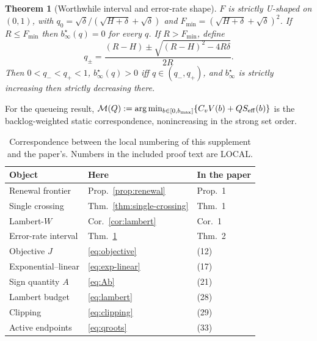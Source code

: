 \documentclass[journal]{IEEEtran}
\newtheorem{theorem}{Theorem}
\theoremstyle{definition}
\begin{document}
\begin{theorem}[Worthwhile interval and error-rate shape]
\label{thm:q-shape}
\(F\) is strictly U-shaped on \((0,1)\), with
\(q_0=\sqrt{\delta}/(\sqrt{H+\delta}+\sqrt{\delta})\) and
\(F_{\min}=(\sqrt{H+\delta}+\sqrt{\delta})^2\).  If \(R\leq F_{\min}\) then
\(b_\infty^\star(q)=0\) for every \(q\).  If \(R>F_{\min}\), define
\begin{equation}
 q_\pm=\frac{(R-H)\pm\sqrt{(R-H)^2-4R\delta}}{2R}.
\label{eq:qroots}
\end{equation}
Then \(0<q_-<q_+<1\), \(b_\infty^\star(q)>0\) iff \(q\in(q_-,q_+)\), and
\(b_\infty^\star\) is strictly increasing then strictly decreasing there.
\end{theorem}

For the queueing result, \(\mathcal M(Q):=\arg\min_{b\in[0,b_{\max}]}
\{C_vV(b)+QS_{\rm eff}(b)\}\) is the backlog-weighted static
correspondence, nonincreasing in the strong set order.

\begin{table}[t]
\centering
\caption{Correspondence between the local numbering of this supplement and
the paper's.  Numbers in the included proof text are LOCAL.}
\label{tab:numbering}
\small
\begin{tabular}{lll}
\toprule
Object & Here & In the paper\\
\midrule
Renewal frontier      & Prop.~\ref{prop:renewal}       & Prop.~1\\
Single crossing       & Thm.~\ref{thm:single-crossing} & Thm.~1\\
Lambert-\(W\)         & Cor.~\ref{cor:lambert}         & Cor.~1\\
Error-rate interval   & Thm.~\ref{thm:q-shape}         & Thm.~2\\
Objective \(J\)       & \eqref{eq:objective}           & (12)\\
Exponential--linear   & \eqref{eq:exp-linear}          & (17)\\
Sign quantity \(A\)   & \eqref{eq:Ab}                  & (21)\\
Lambert budget        & \eqref{eq:lambert}             & (28)\\
Clipping              & \eqref{eq:clipping}            & (29)\\
Active endpoints      & \eqref{eq:qroots}              & (33)\\
\bottomrule
\end{tabular}
\end{table}




\end{document}
